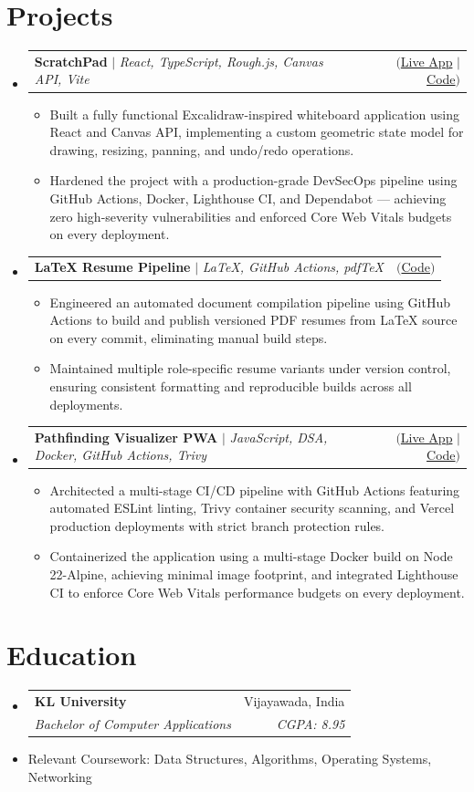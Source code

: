 \documentclass[letterpaper,11pt]{article}
\makeatletter
\newcommand{\resumeItem}[1]{
  \item\small{
    {#1 \vspace{-2pt}}
  }
}
\newcommand{\resumeSubheading}[4]{
  \vspace{-2pt}\item
    \begin{tabular*}{0.97\textwidth}[t]{l@{\extracolsep{\fill}}r}
      \textbf{#1} & #2 \\
      \textit{\small#3} & \textit{\small #4} \\
    \end{tabular*}\vspace{-7pt}
}
\newcommand{\resumeProjectHeading}[2]{
    \item
    \begin{tabular*}{0.97\textwidth}{l@{\extracolsep{\fill}}r}
      \small#1 & #2 \\
    \end{tabular*}\vspace{-7pt}
}
\newcommand{\resumeSubHeadingListStart}{\begin{itemize}[leftmargin=0.15in, label={}]}
\newcommand{\resumeSubHeadingListEnd}{\end{itemize}}
\newcommand{\resumeItemListStart}{\begin{itemize}}
\newcommand{\resumeItemListEnd}{\end{itemize}\vspace{-5pt}}
\makeatother
\begin{document}
\section{Projects}
    \resumeSubHeadingListStart
      \resumeProjectHeading
          {\textbf{ScratchPad} $|$ \emph{React, TypeScript, Rough.js, Canvas API, Vite}}{$(${\href{https://scratchpad.yeshwanth.online}{Live App}} $|$ {\href{https://github.com/yeshwanth-kr/scratchpad}{Code}}$)$}
          \resumeItemListStart
            \resumeItem{Built a fully functional Excalidraw-inspired whiteboard application using React and Canvas API, implementing a custom geometric state model for drawing, resizing, panning, and undo/redo operations.}
            \resumeItem{Hardened the project with a production-grade DevSecOps pipeline using GitHub Actions, Docker, Lighthouse CI, and Dependabot — achieving zero high-severity vulnerabilities and enforced Core Web Vitals budgets on every deployment.}
          \resumeItemListEnd
      \resumeProjectHeading
          {\textbf{LaTeX Resume Pipeline} $|$ \emph{ LaTeX, GitHub Actions, pdfTeX}}{$(${\href{https://github.com/Yeshwanth-kr/latex-resume}{Code}}$)$}
          \resumeItemListStart
            \resumeItem{Engineered an automated document compilation pipeline using GitHub Actions to build and publish versioned PDF resumes from LaTeX source on every commit, eliminating manual build steps.}
            \resumeItem{Maintained multiple role-specific resume variants under version control, ensuring consistent formatting and reproducible builds across all deployments.}
          \resumeItemListEnd
      \resumeProjectHeading
          {\textbf{Pathfinding Visualizer PWA} $|$ \emph{JavaScript, DSA, Docker, GitHub Actions, Trivy}}{$(${\href{https://visualize.yeshwanth.online}{Live App}} $|$ {\href{https://github.com/Yeshwanth-kr/pathfinding-visualizer-pwa}{Code}}$)$}
          \resumeItemListStart
            \resumeItem{Architected a multi-stage CI/CD pipeline with GitHub Actions featuring automated ESLint linting, Trivy container security scanning, and Vercel production deployments with strict branch protection rules.}
            \resumeItem{Containerized the application using a multi-stage Docker build on Node 22-Alpine, achieving minimal image footprint, and integrated Lighthouse CI to enforce Core Web Vitals performance budgets on every deployment.}
          \resumeItemListEnd
    \resumeSubHeadingListEnd


\section{Education}
  \resumeSubHeadingListStart
    \resumeSubheading
      {KL University}{Vijayawada, India}
      {Bachelor of Computer Applications}{CGPA: 8.95}
      \resumeItem{Relevant Coursework: Data Structures, Algorithms, Operating Systems, Networking}
  \resumeSubHeadingListEnd


\end{document}
